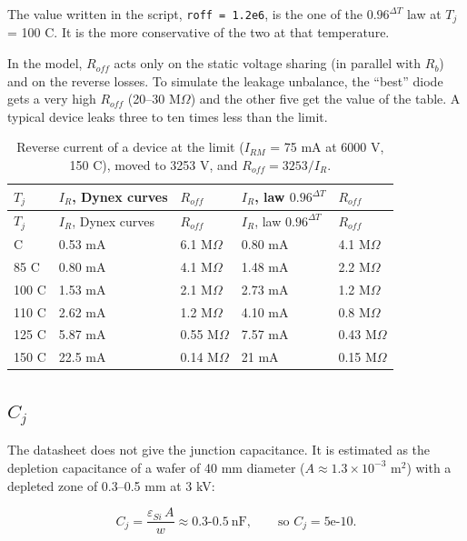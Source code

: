\documentclass[11pt,a4paper,numbers=noenddot]{scrartcl}
\begin{document}
\begin{onehalfspace}
The value written in the script, \texttt{roff\ =\ 1.2e6}, is the one of the \(0.96^{\Delta T}\) law at \(T_j\) = 100 \textdegree{}C. It is the more conservative of the two at that temperature.

In the model, \(R_{off}\) acts only on the static voltage sharing (in parallel with \(R_b\)) and on the reverse losses. To simulate the leakage unbalance, the ``best'' diode gets a very high \(R_{off}\) (20--30 M\(\Omega\)) and the other five get the value of the table. A typical device leaks three to ten times less than the limit.

{\small\singlespacing
\begin{longtable}[]{@{}lllll@{}}
\caption{Reverse current of a device at the limit (\(I_{RM}\) = 75 mA at 6000 V, 150 \textdegree{}C), moved to 3253 V, and \(R_{off} = 3253/I_R\).}\tabularnewline
\toprule\noalign{}
\(T_j\) & \(I_R\), Dynex curves & \(R_{off}\) & \(I_R\), law \(0.96^{\Delta T}\) & \(R_{off}\) \\
\midrule\noalign{}
\endfirsthead
\toprule\noalign{}
\(T_j\) & \(I_R\), Dynex curves & \(R_{off}\) & \(I_R\), law \(0.96^{\Delta T}\) & \(R_{off}\) \\
\midrule\noalign{}
\endhead
\bottomrule\noalign{}
\endlastfoot
70 \textdegree{}C & 0.53 mA & 6.1 M\(\Omega\) & 0.80 mA & 4.1 M\(\Omega\) \\
85 \textdegree{}C & 0.80 mA & 4.1 M\(\Omega\) & 1.48 mA & 2.2 M\(\Omega\) \\
100 \textdegree{}C & 1.53 mA & 2.1 M\(\Omega\) & 2.73 mA & 1.2 M\(\Omega\) \\
110 \textdegree{}C & 2.62 mA & 1.2 M\(\Omega\) & 4.10 mA & 0.8 M\(\Omega\) \\
125 \textdegree{}C & 5.87 mA & 0.55 M\(\Omega\) & 7.57 mA & 0.43 M\(\Omega\) \\
150 \textdegree{}C & 22.5 mA & 0.14 M\(\Omega\) & 21 mA & 0.15 M\(\Omega\) \\
\end{longtable}
}

\subsection{\texorpdfstring{\(C_j\)}{C\_j}}\label{c_j}

The datasheet does not give the junction capacitance. It is estimated as the depletion capacitance of a wafer of 40 mm diameter (\(A \approx 1.3 \times 10^{-3}\) m\(^{2}\)) with a depleted zone of 0.3--0.5 mm at 3 kV:

\[C_j = \frac{\varepsilon_{Si}\, A}{w} \approx 0.3\text{-}0.5\ \text{nF}, \qquad \text{so } C_j = \text{5e-10}.\]


\end{onehalfspace}
\end{document}
